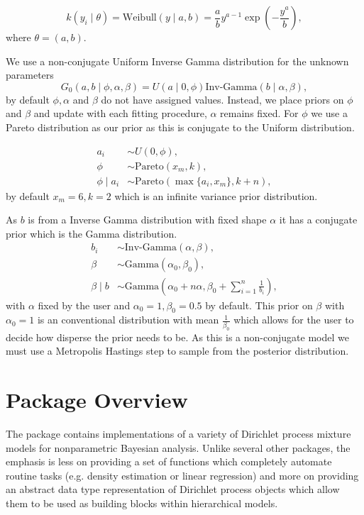 \documentclass[nojss]{jss}
\begin{document}
\begin{equation}
k(y_i \mid \theta) = \text{Weibull} (y \mid a, b) = \frac{a}{b} y ^{a-1}  \exp \left( -  \frac{y^a}{b}  \right),
\end{equation}
where $\theta = ( a, b )$.

We use a non-conjugate Uniform Inverse Gamma distribution for the unknown parameters
\begin{equation}
G_0 (a, b \mid \phi, \alpha, \beta) = U(a \mid 0, \phi ) \text{Inv-Gamma} ( b \mid \alpha, \beta),
\end{equation}
by default $\phi, \alpha$ and $\beta$ do not have assigned values. Instead, we place priors on $\phi$ and $\beta$ and update with each fitting procedure, $\alpha$ remains fixed. For $\phi$ we use a Pareto distribution as our prior as this is conjugate to the Uniform distribution.

\begin{align*}
a_i & \sim U(0, \phi) ,\\
\phi & \sim \text{Pareto}(x_m , k), \\
\phi \mid a _i & \sim \text{Pareto}( \max \{ a_i , x_m \}, k + n),
\end{align*}
by default $x_m = 6, k=2$ which is an infinite variance prior distribution.

As $b$ is from a Inverse Gamma distribution with fixed shape $\alpha$ it has a conjugate prior which is the Gamma distribution.
\begin{align*}
b_i & \sim \text{Inv-Gamma} ( \alpha , \beta ), \\
\beta & \sim \text{Gamma} (\alpha _0 , \beta _0), \\
\beta \mid b & \sim \text{Gamma} \left( \alpha _0 + n \alpha , \beta _0 + \sum _{i=1} ^n \frac{1}{b_i} \right),
\end{align*}
with $\alpha$ fixed by the user and $ \alpha _0 = 1, \beta _0 = 0.5$ by default. This prior on $\beta$ with $\alpha _0=1$ is an conventional distribution with mean $\frac{1}{\beta _0}$ which allows for the user to decide how disperse the prior needs to be. As this is a non-conjugate model we must use a Metropolis Hastings step to sample from the posterior distribution.

\section{Package Overview}
\label{sec:package}

The  package contains implementations of a variety of Dirichlet process mixture models for nonparametric Bayesian analysis. Unlike several other  packages, the emphasis is less on providing a set of functions which completely automate routine tasks (e.g. density estimation or linear regression) and more on providing an abstract data type representation of Dirichlet process objects which allow them to be used as building blocks within hierarchical models.
\end{document}
